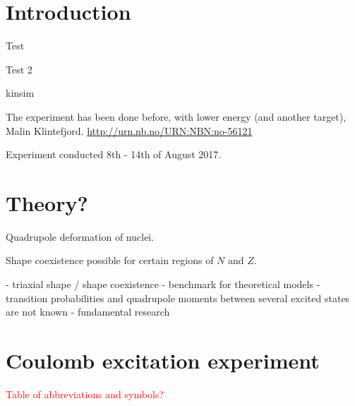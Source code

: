 \documentclass[twoside,english]{uiofysmaster/uiofysmaster}
\begin{document}
\tableofcontents



\chapter{Introduction}
Test \cite{Clement2016}

Test 2 \cite{OCLweb}

kinsim \cite{kinsim}

The experiment has been done before, with lower energy (and another target), Malin Klintefjord. \url{http://urn.nb.no/URN:NBN:no-56121} \newline
 
 
Experiment conducted 8th - 14th of August 2017.

\chapter{Theory?}

Quadrupole deformation of nuclei. \newline

Shape coexistence possible for certain regions of $N$ and $Z$.

\bigskip

- triaxial shape / shape coexistence \newline
- benchmark for theoretical models \newline
- transition probabilities and quadrupole moments between several excited states are not known \newline
- fundamental research



\chapter{Coulomb excitation experiment} 
\textcolor{red}{Table of abbreviations and symbols?}
\end{document}
